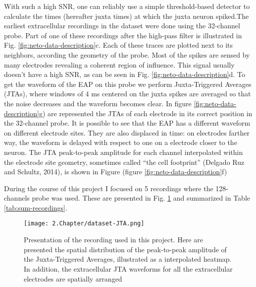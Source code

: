With such a high SNR, one can reliably use a simple threshold-based detector to calculate the times (hereafter juxta times) at which the juxta neuron spiked.The earliest extracellular recordings in the dataset were done using the 32-channel probe. Part of one of these recordings after the high-pass filter is illustrated in Fig. \ref{fig:neto-data-description}c.  Each of these traces are plotted next to its neighbors, according the geometry of the probe. Most of the spikes are sensed by many electrodes revealing a coherent region of influence. This signal usually doesn't have a high SNR, as can be seen in Fig. \ref{fig:neto-data-description}d. To get the waveform of the EAP on this probe we perform Juxta-Triggered Averages (JTAs), where windows of 4 ms centered on the juxta spikes are averaged so that the noise decreases and the waveform becomes clear. In figure \ref{fig:neto-data-description}g) are represented the JTAs of each electrode in its correct position in the 32-channel probe. It is possible to see that the EAP has a different waveform on different electrode sites. They are also displaced in time: on electrodes farther way, the waveform is delayed with respect to one on a electrode closer to the neuron. The JTA peak-to-peak amplitude for each channel interpolated within the electrode site geometry, sometimes called “the cell footprint” (Delgado Ruz and Schultz, 2014), is shown in Figure (figure \ref{fig:neto-data-description}f)

During the course of this project I focused on 5 recordings where the 128-channels probe was used. These are presented in Fig. \ref{fig:recordings-summary} and summarized in Table \ref{tab:sum-recordings}.

\begin{figure}[!h]
	\centering
	\texttt{[image: 2.Chapter/dataset-JTA.png]}
	\caption{Presentation of the recording used in this project. Here are presented the spatial distribution of the peak-to-peak amplitude of the Juxta-Triggered Averages, illustrated as a interpolated heatmap. In addition, the extracellular JTA waveforms for all the extracellular electrodes are spatially arranged
}
\label{fig:recordings-summary}
\end{figure}



